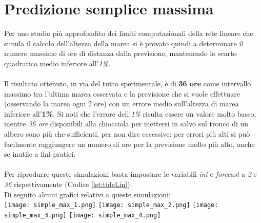 	\section{Predizione semplice massima}
		Per uno studio più approfondito dei limiti computazionali della rete lineare che simula il calcolo dell'altezza della marea si è provato quindi a determinare il numero massimo di ore di distanza dalla previsione, mantenendo lo scarto quadratico medio inferiore all'\textit{1\%}.\\
		\\
		Il risultato ottenuto, in via del tutto sperimentale, è di \textbf{36 ore} come intervallo massimo tra l'ultima marea osservata e la previsione che si vuole effettuare (osservando la marea ogni 2 ore) con un errore medio sull'altezza di marea inferiore all'\textbf{1\%}.
		Si noti che l'errore dell'\textit{1\%} risulta essere un valore molto basso, mentre \textit{36 ore} disponibili alla chiocciola per mettersi in salvo sul tronco di un albero sono più che sufficienti, per non dire eccessive: per errori più alti si può facilmente raggiungere un numero di ore per la previsione molto più alto, anche se inutile a fini pratici.\\
		\\
		Per riprodurre queste simulazioni basta impostare le variabili \textit{int} e \textit{forecast} a \textit{2} e \textit{36} rispettivamente (Codice \ref{lst:tideLin}).\\
		Di seguito alcuni grafici relativi a queste simulazioni:\\
		\texttt{[image: simple\_max\_1.png]}
		\texttt{[image: simple\_max\_2.png]}
		\texttt{[image: simple\_max\_3.png]}
		\texttt{[image: simple\_max\_4.png]}
		\FloatBarrier